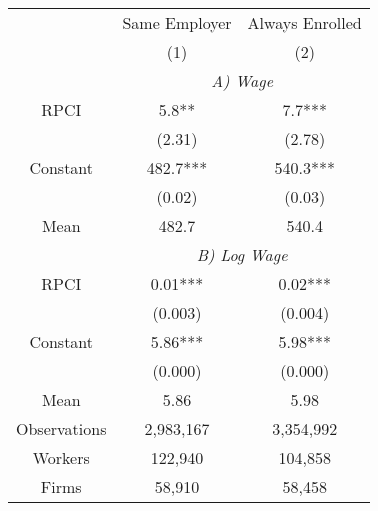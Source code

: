 \begin{tabular}{ccc}
\toprule
\toprule
      & Same Employer & Always Enrolled \\
      & (1)   & (2) \\
\cmidrule{2-3}      & \multicolumn{2}{c}{\textit{A) Wage}} \\
\midrule
RPCI  & 5.8** & 7.7*** \\
      & (2.31) & (2.78) \\
Constant & 482.7*** & 540.3*** \\
      & (0.02) & (0.03) \\
Mean  & 482.7 & 540.4 \\
\cmidrule{2-3}      & \multicolumn{2}{c}{\textit{B) Log Wage}} \\
\midrule
RPCI  & 0.01*** & 0.02*** \\
      & (0.003) & (0.004) \\
Constant & 5.86*** & 5.98*** \\
      & (0.000) & (0.000) \\
Mean  & 5.86  & 5.98 \\
\midrule
Observations & 2,983,167 & 3,354,992 \\
Workers & 122,940 & 104,858 \\
Firms & 58,910 & 58,458 \\
\bottomrule
\bottomrule
\end{tabular}%
